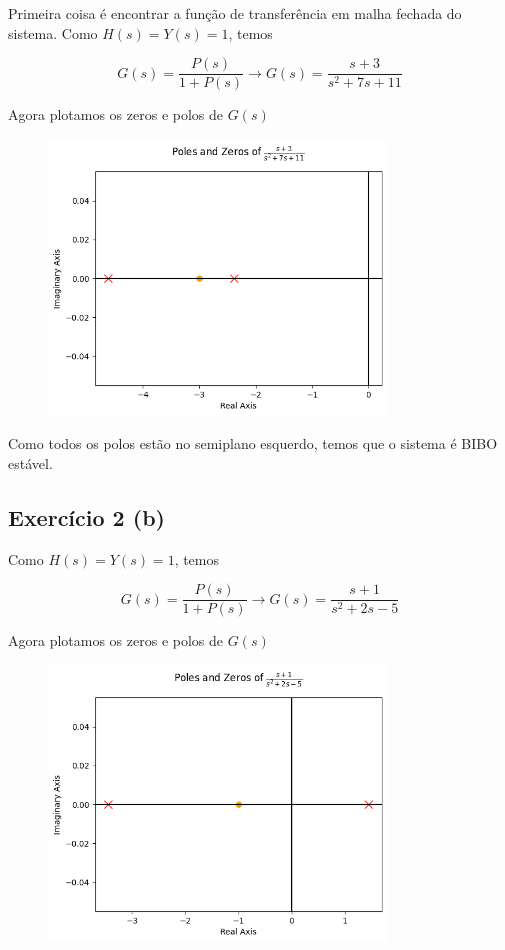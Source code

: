 \documentclass[12pt]{scrartcl}
\begin{document}
Primeira coisa é encontrar a função de transferência em malha fechada
do sistema. Como $H(s) = Y(s) = 1$, temos 

\[ G(s) = \frac{P(s)}{1 + P(s)} \longrightarrow G(s) = \frac{s + 3}{s^{2} + 7 s + 11}\]

Agora plotamos os zeros e polos de $G(s)$

\begin{figure}[htp!]
	\begin{center}
    \includegraphics[width=0.8\textwidth,trim=1 1 1 1,clip]{ex2a.png}
	\end{center}
\end{figure}

Como todos os polos estão no semiplano esquerdo, temos que o sistema é BIBO estável.

\subsection*{Exercício 2 (b)}

Como $H(s) = Y(s) = 1$, temos 

\[ G(s) = \frac{P(s)}{1 + P(s)} \longrightarrow G(s) = \frac{s + 1}{s^{2} + 2 s - 5} \]

Agora plotamos os zeros e polos de $G(s)$

\begin{figure}[htp!]
	\begin{center}
    \includegraphics[width=0.8\textwidth,trim=1 1 1 1,clip]{ex2b.png}
	\end{center}
\end{figure}
\end{document}

